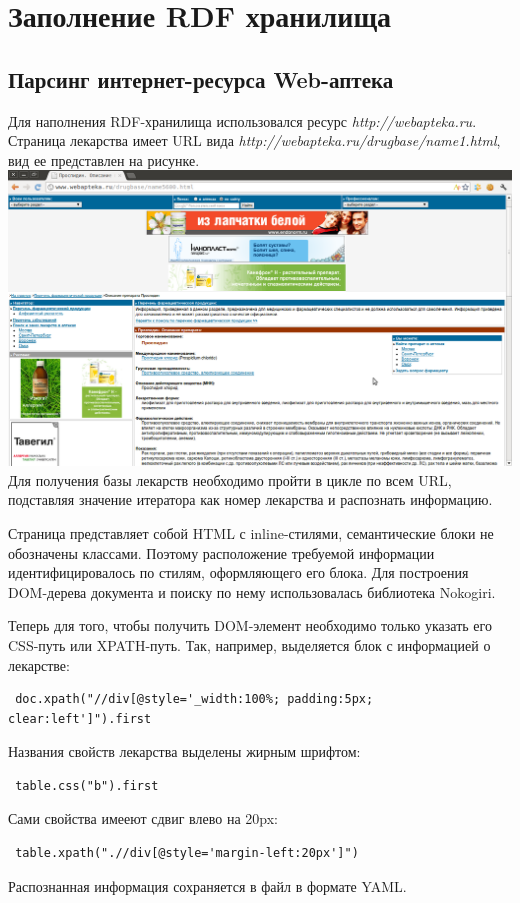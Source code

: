 \documentclass[specialist,subf,href,colorlinks=true
]{disser}
\begin{document}
\chapter{Заполнение RDF хранилища}
\section{Парсинг интернет-ресурса Web-аптека}
Для наполнения RDF-хранилища использовался ресурс \textit{http://webapteka.ru}. Страница лекарства имеет URL вида \textit{http://webapteka.ru/drugbase/name1.html}, вид ее представлен на рисунке.
\\ \includegraphics[width=160mm]{3.png}
\\Для получения базы лекарств необходимо пройти в цикле по всем URL, подставляя значение итератора как номер лекарства и распознать информацию.

Страница представляет собой HTML с inline-стилями, семантические блоки не обозначены классами. Поэтому расположение требуемой информации идентифицировалось по стилям, оформляющего его блока. Для построения DOM-дерева документа и поиску по нему использовалась библиотека Nokogiri. \cite{nokogiri}

Теперь для того, чтобы получить DOM-элемент необходимо только указать его CSS-путь или XPATH-путь. Так, например, выделяется блок с информацией о лекарстве:
\begin{lstlisting}
 doc.xpath("//div[@style='_width:100%; padding:5px; clear:left']").first
\end{lstlisting}
Названия свойств лекарства выделены жирным шрифтом:
\begin{lstlisting}
 table.css("b").first
\end{lstlisting}
Сами свойства имееют сдвиг влево на 20px:
\begin{lstlisting}
 table.xpath(".//div[@style='margin-left:20px']")
\end{lstlisting}
Распознанная информация сохраняется в файл в формате YAML.
\end{document}
